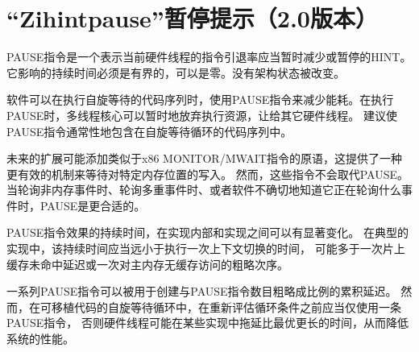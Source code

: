 \chapter{“Zihintpause”暂停提示（2.0版本）}
\label{chap:zihintpause}

PAUSE指令是一个表示当前硬件线程的指令引退率应当暂时减少或暂停的HINT。
它影响的持续时间必须是有界的，可以是零。没有架构状态被改变。

\begin{commentary}
软件可以在执行自旋等待的代码序列时，使用PAUSE指令来减少能耗。在执行PAUSE时，多线程核心可以暂时地放弃执行资源，让给其它硬件线程。
建议使PAUSE指令通常性地包含在自旋等待循环的代码序列中。

未来的扩展可能添加类似于x86 MONITOR/MWAIT指令的原语，这提供了一种更有效的机制来等待对特定内存位置的写入。
然而，这些指令不会取代PAUSE。当轮询非内存事件时、轮询多重事件时、或者软件不确切地知道它正在轮询什么事件时，PAUSE是更合适的。

PAUSE指令效果的持续时间，在实现内部和实现之间可以有显著变化。
在典型的实现中，该持续时间应当远小于执行一次上下文切换的时间，
可能多于一次片上缓存未命中延迟或一次对主内存无缓存访问的粗略次序。

一系列PAUSE指令可以被用于创建与PAUSE指令数目粗略成比例的累积延迟。
然而，在可移植代码的自旋等待循环中，在重新评估循环条件之前应当仅使用一条PAUSE指令，
否则硬件线程可能在某些实现中拖延比最优更长的时间，从而降低系统的性能。
\end{commentary}

